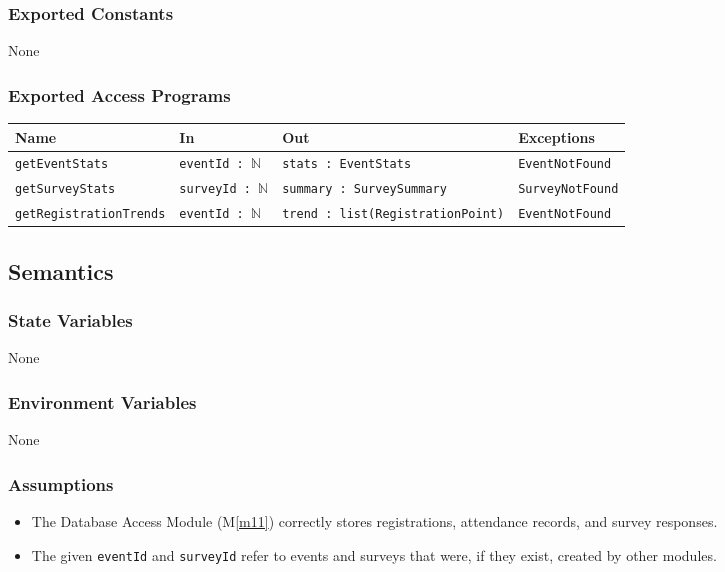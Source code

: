 \documentclass[12pt, titlepage]{article}
\begin{document}
\subsubsection{Exported Constants}

None

\subsubsection{Exported Access Programs}

\begin{center}
\begin{tabularx}{\textwidth}{p{} p{} p{} p{}}
\hline
\textbf{Name} & \textbf{In} & \textbf{Out} & \textbf{Exceptions} \\
\hline
\texttt{getEventStats} &
\texttt{eventId : $\mathbb{N}$} &
\texttt{stats : EventStats} &
\texttt{EventNotFound} \\
\hline
\texttt{getSurveyStats} &
\texttt{surveyId : $\mathbb{N}$} &
\texttt{summary : SurveySummary} &
\texttt{SurveyNotFound} \\
\hline
\texttt{getRegistrationTrends} &
\texttt{eventId : $\mathbb{N}$} &
\texttt{trend : list(RegistrationPoint)} &
\texttt{EventNotFound} \\
\hline
\end{tabularx}
\end{center}


\subsection{Semantics}

\subsubsection{State Variables}

None

\subsubsection{Environment Variables}

None

\subsubsection{Assumptions}

\begin{itemize}
  \item The Database Access Module (M\ref{m11}) correctly stores registrations,
        attendance records, and survey responses.
  \item The given \texttt{eventId} and \texttt{surveyId} refer to events and
        surveys that were, if they exist, created by other modules.
\end{itemize}
\end{document}
